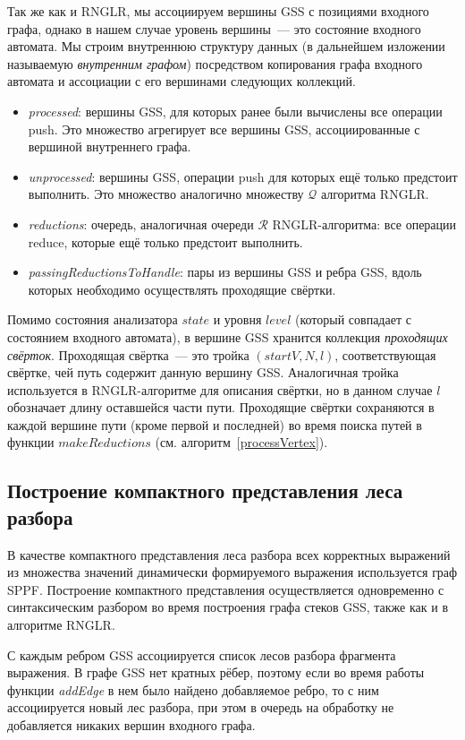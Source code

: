 Так же как и RNGLR, мы ассоциируем вершины GSS с позициями входного графа, однако в нашем случае уровень вершины~--- это состояние входного автомата. Мы строим внутреннюю структуру данных (в дальнейшем изложении называемую \emph{внутренним графом}) посредством копирования графа входного автомата и ассоциации с его вершинами следующих коллекций.
\begin{itemize}
  \item \emph{processed}: вершины GSS, для которых ранее были вычислены все операции push. Это множество агрегирует все вершины GSS, ассоциированные с вершиной внутреннего графа.
  \item \emph{unprocessed}: вершины GSS, операции push для которых ещё только предстоит выполнить. Это множество аналогично множеству $\mathcal{Q}$ алгоритма RNGLR.
  \item \emph{reductions}: очередь, аналогичная очереди $\mathcal{R}$ RNGLR-алгоритма: все операции reduce, которые ещё только предстоит выполнить.
  \item \emph{passingReductionsToHandle}: пары из вершины GSS и ребра GSS, вдоль которых необходимо осуществлять проходящие свёртки.
\end{itemize}

Помимо состояния анализатора $state$ и уровня $level$ (который совпадает с состоянием входного автомата), в вершине GSS хранится коллекция \emph{проходящих свёрток}. Проходящая свёртка~--- это тройка $(startV, N, l)$, соответствующая свёртке, чей путь содержит данную вершину GSS. Аналогичная тройка используется в RNGLR-алгоритме для описания свёртки, но в данном случае $l$ обозначает длину оставшейся части пути. Проходящие свёртки сохраняются в каждой вершине пути (кроме первой и последней) во время поиска путей в функции $makeReductions$ (см. алгоритм~\ref{processVertex}).

\subsection{Построение компактного представления леса разбора}
В качестве компактного представления леса разбора всех корректных выражений из множества значений динамически формируемого выражения используется граф SPPF. Построение компактного представления осуществляется одновременно с синтаксическим разбором во время построения графа стеков GSS, также как и в алгоритме RNGLR.

С каждым ребром GSS ассоциируется список лесов разбора фрагмента выражения. В графе GSS нет кратных рёбер, поэтому если во время работы функции \emph{addEdge} в нем было найдено добавляемое ребро, то с ним ассоциируется новый лес разбора, при этом в очередь на обработку не добавляется никаких вершин входного графа.  


